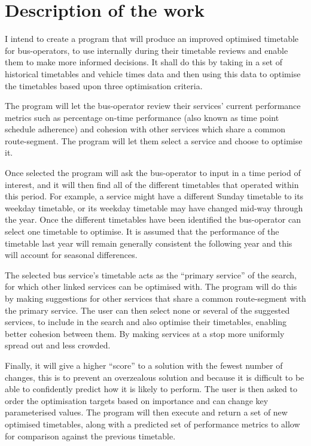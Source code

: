 \documentclass{article}
\begin{document}
\section{Description of the work}

I intend to create a program that will produce an improved optimised timetable for bus-operators, to use internally during their timetable reviews and enable them to make more informed decisions. It shall do this by taking in a set of historical timetables and vehicle times data and then using this data to optimise the timetables based upon three optimisation criteria. 


\par
The program will let the bus-operator review their services' current performance metrics such as percentage on-time performance (also known as time point schedule adherence) and cohesion with other services which share a common route-segment. The program will let them select a service and choose to optimise it.

\par
Once selected the program will ask the bus-operator to input in a time period of interest, and it will then find all of the different timetables that operated within this period. For example, a service might have a different Sunday timetable to its weekday timetable, or its weekday timetable may have changed mid-way through the year. Once the different timetables have been identified the bus-operator can select one timetable to optimise. It is assumed that the performance of the timetable last year will remain generally consistent the following year and this will account for seasonal differences. 

\par 
The selected bus service's timetable acts as the ``primary service'' of the search, for which other linked services can be optimised with. The program will do this by making suggestions for other services that share a common route-segment with the primary service. The user can then select none or several of the suggested services, to include in the search and also optimise their timetables, enabling better cohesion between them. By making services at a stop more uniformly spread out and less crowded.


\par
Finally, it will give a higher ``score'' to a solution with the fewest number of changes, this is to prevent an overzealous solution and because it is difficult to be able to confidently predict how it is likely to perform. The user is then asked to order the optimisation targets based on importance and can change key parameterised values. The program will then execute and return a set of new optimised timetables, along with a predicted set of performance metrics to allow for comparison against the previous timetable.
\end{document}
